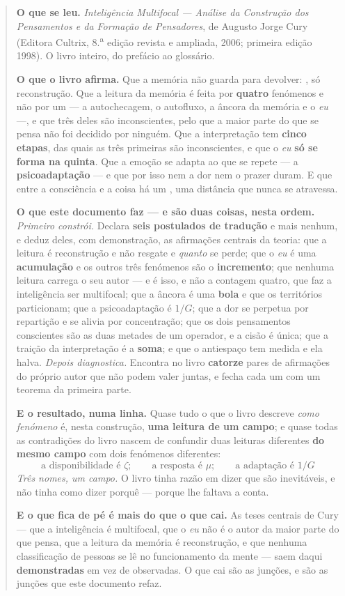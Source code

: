 \documentclass[../livro.tex]{subfiles}
\begin{document}
\begin{abstract}\noindent
\textbf{O que se leu.} \emph{Inteligência Multifocal --- Análise da Construção
dos Pensamentos e da Formação de Pensadores}, de Augusto Jorge Cury (Editora
Cultrix, 8.\textsuperscript{a} edição revista e ampliada, 2006; primeira edição
1998). O livro inteiro, do prefácio ao glossário.

\medskip\noindent\textbf{O que o livro afirma.} Que a memória não guarda para
devolver: , só reconstrução. Que a leitura da memória
é feita por \textbf{quatro} fenómenos e não por um --- a autochecagem, o
autofluxo, a âncora da memória e o \emph{eu} ---, e que três deles são
inconscientes, pelo que a maior parte do que se pensa não foi decidido por
ninguém. Que a interpretação tem \textbf{cinco etapas}, das quais as três
primeiras são inconscientes, e que o \emph{eu} \textbf{só se forma na quinta}.
Que a emoção se adapta ao que se repete --- a \textbf{psicoadaptação} --- e que
por isso nem a dor nem o prazer duram. E que entre a consciência e a coisa há um
, uma distância que nunca se atravessa.

\medskip\noindent\textbf{O que este documento faz --- e são duas coisas, nesta
ordem.} \emph{Primeiro constrói.} Declara \textbf{seis postulados de tradução} e
mais nenhum, e deduz deles, com demonstração, as afirmações centrais da teoria:
que a leitura é reconstrução e não resgate e \emph{quanto} se perde; que o
\emph{eu} é uma \textbf{acumulação} e os outros três fenómenos são o
\textbf{incremento}; que nenhuma leitura carrega o seu autor --- e é isso, e não
a contagem quatro, que faz a inteligência ser multifocal; que a âncora é uma
\textbf{bola} e que os territórios particionam; que a psicoadaptação é
$1/G$; que a dor se perpetua por repartição e se alivia por concentração; que os
dois pensamentos conscientes são as duas metades de um operador, e a cisão é
única; que a traição da interpretação é a \textbf{soma}; e que o antiespaço tem
medida e ela halva. \emph{Depois diagnostica.} Encontra no livro
\textbf{catorze} pares de afirmações do próprio autor que não podem valer
juntas, e fecha cada um com um teorema da primeira parte.

\medskip\noindent\textbf{E o resultado, numa linha.} Quase tudo o que o livro
descreve \emph{como fenómeno} é, nesta construção, \textbf{uma leitura de um
campo}; e quase todas as contradições do livro nascem de confundir duas leituras
diferentes \textbf{do mesmo campo} com dois fenómenos diferentes:
\[
\boxed{\;\text{a disponibilidade é }\zeta;\qquad
\text{a resposta é }\mu;\qquad
\text{a adaptação é }1/G\;}
\]
\emph{Três nomes, um campo.} O livro tinha razão em dizer que são inevitáveis, e
não tinha como dizer porquê --- porque lhe faltava a conta.

\medskip\noindent\textbf{E o que fica de pé é mais do que o que cai.} As teses
centrais de Cury --- que a inteligência é multifocal, que o \emph{eu} não é o
autor da maior parte do que pensa, que a leitura da memória é reconstrução, e que
nenhuma classificação de pessoas se lê no funcionamento da mente --- saem daqui
\textbf{demonstradas} em vez de observadas. O que cai são as junções, e são as
junções que este documento refaz.
\end{abstract}
\end{document}
